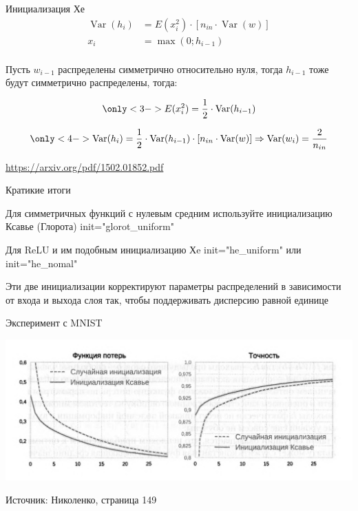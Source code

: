 \documentclass[notes,12pt, aspectratio=169]{beamer}
\newenvironment{wideitemize}{\itemize\addtolength{\itemsep}{10pt}}{\enditemize}
\DeclareMathOperator{\Var}{Var}
\begin{document}
\begin{frame}{Инициализация Хе}
	\begin{align*} 	
	\Var(h_i)  & =   E(x_i^2)  \cdot [n_{in} \cdot \Var(w)] \\
	x_i & = \max(0; h_{i-1}) \\ 
	\end{align*} \pause 
	
 { Пусть $w_{i-1}$ распределены симметрично относительно нуля, тогда $h_{i-1}$ тоже будут симметрично распределены, тогда: }
	
$$
\only<3->{ E(x_i^2) = \frac{1}{2} \cdot \Var(h_{i-1}) }
$$

$$
\only<4->{ \Var(h_i) =  \frac{1}{2} \cdot \Var(h_{i-1}) \cdot [n_{in} \cdot \Var(w)]  \Rightarrow \Var(w_i) = \frac{2}{n_{in}} }
$$

\vfill %
\footnotesize
{\color{blue} \url{https://arxiv.org/pdf/1502.01852.pdf}}
\end{frame}


\begin{frame}{Кратикие итоги}
\begin{wideitemize}
\item  Для симметричных функций с нулевым средним используйте инициализацию Ксавье (Глорота) {\color{green}  init="glorot\_uniform"} 
\item  Для ReLU и им подобным инициализацию Хe {\color{green} init="he\_uniform"} или {\color{green} init="he\_nomal"}
\item  Эти две инициализации корректируют параметры распределений в зависимости от входа и выхода слоя так, чтобы поддерживать дисперсию равной единице
\end{wideitemize}
\end{frame}


\begin{frame}{Эксперимент с MNIST}
\begin{center}
	\includegraphics[width=.8\linewidth]{nicol_init.png}
\end{center}

\vfill
{\small  Источник: Николенко, страница 149}
\end{frame}
\end{document}
